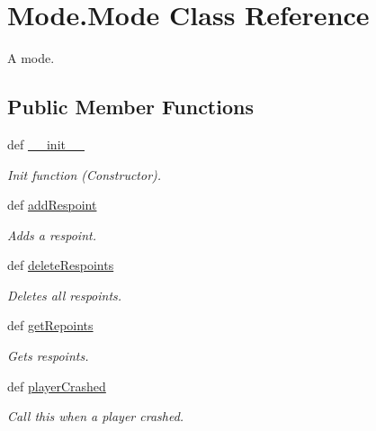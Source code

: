 \hypertarget{class_mode_1_1_mode}{
\section{Mode.Mode Class Reference}
\label{class_mode_1_1_mode}
}


A mode.  


\subsection*{Public Member Functions}
\begin{DoxyCompactItemize}
\item 
def \hyperlink{class_mode_1_1_mode_add2325e8a6bf4ff3aacb7c1dd3299e5a}{\_\-\_\-init\_\-\_\-}
\begin{DoxyCompactList}\small\item\em Init function (Constructor). \item\end{DoxyCompactList}\item 
def \hyperlink{class_mode_1_1_mode_a48c269456fe39631862a8be79627b0e5}{addRespoint}
\begin{DoxyCompactList}\small\item\em Adds a respoint. \item\end{DoxyCompactList}\item 
def \hyperlink{class_mode_1_1_mode_a098cfc6ad819a1db17be57c9548bd199}{deleteRespoints}
\begin{DoxyCompactList}\small\item\em Deletes all respoints. \item\end{DoxyCompactList}\item 
def \hyperlink{class_mode_1_1_mode_a982f3bf8cfcade38459c67bbf6a64409}{getRepoints}
\begin{DoxyCompactList}\small\item\em Gets respoints. \item\end{DoxyCompactList}\item 
def \hyperlink{class_mode_1_1_mode_a68362e7b1cdd6ee60378f3cc1322a144}{playerCrashed}
\begin{DoxyCompactList}\small\item\em Call this when a player crashed. \item\end{DoxyCompactList}\item 

\end{DoxyCompactItemize}
